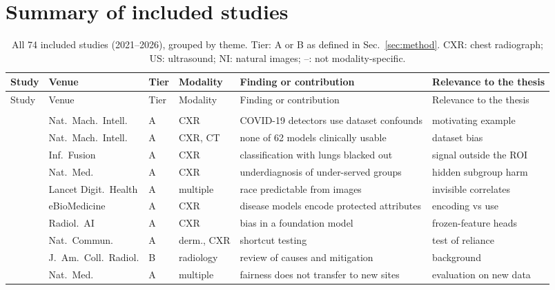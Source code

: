 \documentclass[11pt,a4paper]{article}
\begin{document}
\section{Summary of included studies}\label{sec:table}
\begingroup\footnotesize\setlength{\tabcolsep}{3pt}
\begin{longtable}{P{2.5cm}P{2.5cm}P{0.6cm}P{1.6cm}P{4.15cm}P{4.2cm}}
\caption{All 74 included studies (2021--2026), grouped by theme. Tier: A or B as defined in Sec.~\ref{sec:method}.
CXR: chest radiograph; US: ultrasound; NI: natural images; --: not modality-specific.}\label{tab:all}\\\toprule
Study & Venue & Tier & Modality & Finding or contribution & Relevance to the thesis \\\midrule\endfirsthead
\toprule Study & Venue & Tier & Modality & Finding or contribution & Relevance to the thesis \\\midrule\endhead
\bottomrule\endfoot
{}\\
\citet{degrave2021ai} & Nat.\ Mach.\ Intell. & A & CXR & COVID-19 detectors use dataset confounds & motivating example \\
\citet{roberts2021pitfalls} & Nat.\ Mach.\ Intell. & A & CXR, CT & none of 62 models clinically usable & dataset bias \\
\citet{maguolo2021critic} & Inf.\ Fusion & A & CXR & classification with lungs blacked out & signal outside the ROI \\
\citet{seyyedkalantari2021underdiagnosis} & Nat.\ Med. & A & CXR & underdiagnosis of under-served groups & hidden subgroup harm \\
\citet{gichoya2022race} & Lancet Digit.\ Health & A & multiple & race predictable from images & invisible correlates \\
\citet{glocker2023encoding} & eBioMedicine & A & CXR & disease models encode protected attributes & encoding vs use \\
\citet{glocker2023foundation} & Radiol.\ AI & A & CXR & bias in a foundation model & frozen-feature heads \\
\citet{brown2023shortcut} & Nat.\ Commun. & A & derm., CXR & shortcut testing & test of reliance \\
\citet{banerjee2023shortcuts} & J.\ Am.\ Coll.\ Radiol. & B & radiology & review of causes and mitigation & background \\
\citet{yang2024limits} & Nat.\ Med. & A & multiple & fairness does not transfer to new sites & evaluation on new data \\

\end{longtable}
\end{document}
